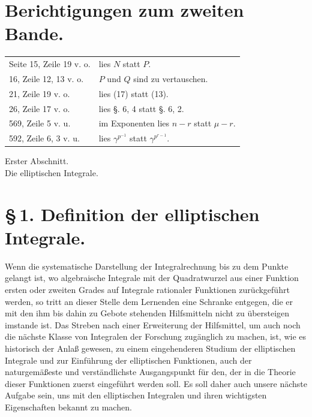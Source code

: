 \documentclass[11pt]{article}
\begin{document}
\section*{Berichtigungen zum zweiten Bande.}
\begin{longtable}{p{}p{}}
Seite 15, Zeile 19 v. o. & lies $N$ statt $P$.\\
16, Zeile 12, 13 v. o. & $P$ und $Q$ sind zu vertauschen.\\
21, Zeile 19 v. o. & lies (17) statt (13).\\
26, Zeile 17 v. o. & lies §. 6, 4 statt §. 6, 2.\\
569, Zeile 5 v. u. & im Exponenten lies $n-r$ statt $\mu-r$.\\
592, Zeile 6, 3 v. u. & lies $\gamma^{p^{-1}}$ statt $\gamma^{p^{r-1}}$.\\
\end{longtable}


\clearpage
\begin{center}
{\large Erster Abschnitt.}\\[0.7em]
{\Large Die elliptischen Integrale.}
\end{center}

\section*{\S\,1. Definition der elliptischen Integrale.}

Wenn die systematische Darstellung der Integralrechnung bis zu dem Punkte gelangt ist, wo algebraische Integrale mit der Quadratwurzel aus einer Funktion ersten oder zweiten Grades auf Integrale rationaler Funktionen zurückgeführt werden, so tritt an dieser Stelle dem Lernenden eine Schranke entgegen, die er mit den ihm bis dahin zu Gebote stehenden Hilfsmitteln nicht zu übersteigen imstande ist. Das Streben nach einer Erweiterung der Hilfsmittel, um auch noch die nächste Klasse von Integralen der Forschung zugänglich zu machen, ist, wie es historisch der Anlaß gewesen, zu einem eingehenderen Studium der elliptischen Integrale und zur Einführung der elliptischen Funktionen, auch der naturgemäßeste und verständlichste Ausgangspunkt für den, der in die Theorie dieser Funktionen zuerst eingeführt werden soll. Es soll daher auch unsere nächste Aufgabe sein, uns mit den elliptischen Integralen und ihren wichtigsten Eigenschaften bekannt zu machen.
\end{document}
